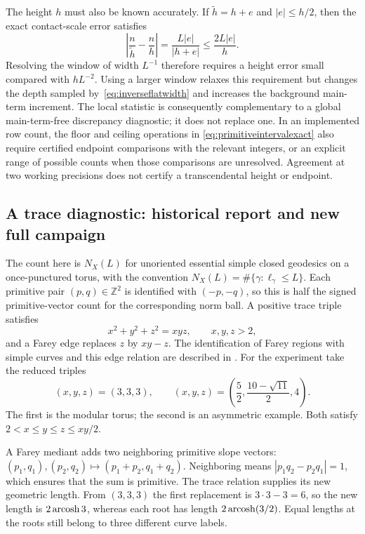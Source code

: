 The height $h$ must also be known accurately. If $\widetilde h=h+e$
and $|e|\le h/2$, then the exact contact-scale error satisfies
\[
 \left|\frac n{\widetilde h}-\frac nh\right|
 =\frac{L|e|}{|h+e|}\le\frac{2L|e|}{h}.
\]
Resolving the window of width $L^{-1}$ therefore requires a height
error small compared with $hL^{-2}$.
Using a larger window relaxes this requirement but changes the depth
sampled by~\eqref{eq:inverseflatwidth} and increases the background
main-term increment. The local statistic is consequently complementary
to a global main-term-free discrepancy diagnostic; it does not replace
one. In an implemented row count, the floor and ceiling operations in
\eqref{eq:primitiveintervalexact} also require certified endpoint
comparisons with the relevant integers, or an explicit range of possible
counts when those comparisons are unresolved. Agreement at two working
precisions does not certify a transcendental height or endpoint.



\subsection{A trace diagnostic: historical report and new full campaign}
\label{subsec:torustraceexperiment}

The count here is $N_X(L)$ for unoriented essential simple closed
geodesics on a once-punctured torus, with the convention
$N_X(L)=\#\{\gamma:\ell_\gamma\le L\}$. Each primitive pair
$(p,q)\in\mathbb Z^2$ is identified with $(-p,-q)$, so this is half
the signed primitive-vector count for the corresponding norm ball.
A positive trace triple satisfies
\[
 x^2+y^2+z^2=xyz,\qquad x,y,z>2,
\]
and a Farey edge replaces $z$ by $xy-z$. The identification of Farey
regions with simple curves and this edge relation are described in
\cite[Sections~1--2]{BowditchMarkoff}. For the experiment take the reduced
triples
\begin{equation}
 (x,y,z)=(3,3,3),\qquad
 (x,y,z)=\left(\frac52,\frac{10-\sqrt{11}}2,4\right).
 \label{eq:diagnostictracetriples}
\end{equation}
The first is the modular torus; the second is an asymmetric example.
Both satisfy $2<x\le y\le z\le xy/2$.

A Farey mediant adds two neighboring primitive slope vectors:
$(p_1,q_1),(p_2,q_2)\mapsto(p_1+p_2,q_1+q_2)$.
Neighboring means $|p_1q_2-p_2q_1|=1$, which ensures that the
sum is primitive. The trace relation supplies its new geometric
length. From $(3,3,3)$ the first replacement is $3\cdot3-3=6$,
so the new length is $2\operatorname{arcosh}3$, whereas each root has length
$2\operatorname{arcosh}(3/2)$. Equal lengths at the roots still belong to
three different curve labels.

